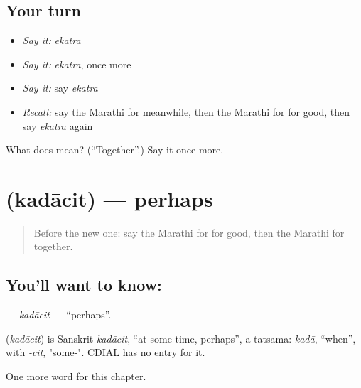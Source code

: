\subsection*{Your turn}
\begin{itemize}
\raggedright
  \item \emph{Say it:} \emph{ekatra}
  \item \emph{Say it:} \emph{ekatra}, once more
  \item \emph{Say it:} say \emph{ekatra}
  \item \emph{Recall:} say the Marathi for meanwhile, then the Marathi for for good, then say \emph{ekatra} again
\end{itemize}

\begin{tcolorbox}[breakable,colback=teal!4,colframe=teal!35!black,title={Before you move on}]
What does  mean? (\textquotedblleft{}Together\textquotedblright{}.) Say it once more.
\end{tcolorbox}
\section[\texorpdfstring{\mr{कदाचित} (kadācit)}{कदाचित (kadācit)}]{ (kadācit) — perhaps}

\label{lesson:MR-C231-kadacit}



\begin{quote}
Before the new one: say the Marathi for for good, then the Marathi for together.
\end{quote}

\subsection*{You'll want to know: }
\textbf{} — \emph{kadācit} — \textquotedblleft{}perhaps\textquotedblright{}.

\begin{cousinweb}
\textbf{} (\emph{kadācit}) is Sanskrit \emph{kadācit}, \textquotedblleft{}at some time, perhaps\textquotedblright{}, a tatsama: \emph{kadā}, \textquotedblleft{}when\textquotedblright{}, with \emph{-cit}, "some-". CDIAL has no entry for it.
\end{cousinweb}

\begin{grammarlens}[title={What you've built}]
One more word for this chapter.
\end{grammarlens}

